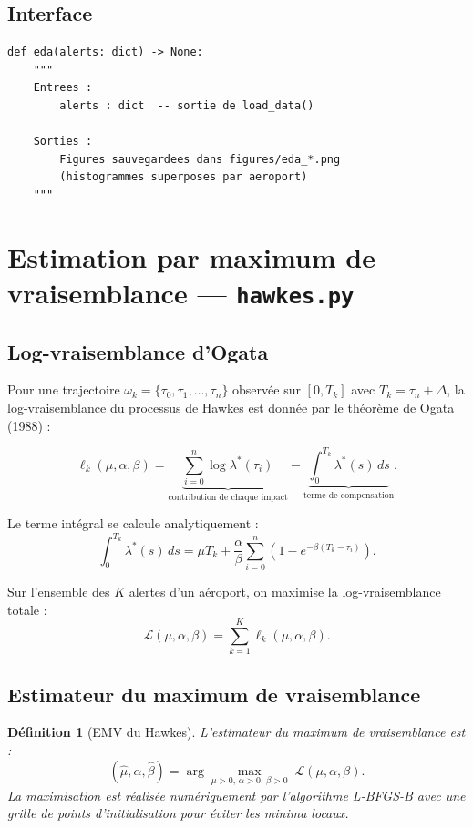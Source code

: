 \documentclass[a4paper,11pt]{article}
\newtheorem{definition}{Définition}[section]
\begin{document}
\subsection{Interface}

\begin{lstlisting}
def eda(alerts: dict) -> None:
    """
    Entrees :
        alerts : dict  -- sortie de load_data()

    Sorties :
        Figures sauvegardees dans figures/eda_*.png
        (histogrammes superposes par aeroport)
    """
\end{lstlisting}

\section{Estimation par maximum de vraisemblance --- \texttt{hawkes.py}}

\subsection{Log-vraisemblance d'Ogata}

Pour une trajectoire $\omega_k = \{\tau_0, \tau_1, \ldots, \tau_n\}$ observée sur $[0, T_k]$ avec $T_k = \tau_n + \Delta$, la log-vraisemblance du processus de Hawkes est donnée par le théorème de Ogata (1988) :

\[
\ell_k(\mu, \alpha, \beta) = \underbrace{\sum_{i=0}^{n} \log \lambda^*(\tau_i)}_{\text{contribution de chaque impact}} - \underbrace{\int_0^{T_k} \lambda^*(s)\,ds}_{\text{terme de compensation}}.
\]

Le terme intégral se calcule analytiquement :
\[
\int_0^{T_k} \lambda^*(s)\,ds = \mu T_k + \frac{\alpha}{\beta} \sum_{i=0}^{n} \left(1 - e^{-\beta(T_k - \tau_i)}\right).
\]

Sur l'ensemble des $K$ alertes d'un aéroport, on maximise la log-vraisemblance totale :
\[
\mathcal{L}(\mu, \alpha, \beta) = \sum_{k=1}^{K} \ell_k(\mu, \alpha, \beta).
\]

\subsection{Estimateur du maximum de vraisemblance}

\begin{definition}[EMV du Hawkes]
L'estimateur du maximum de vraisemblance est :
\[
(\hat\mu, \hat\alpha, \hat\beta) = \arg\max_{\mu > 0,\, \alpha > 0,\, \beta > 0} \;\mathcal{L}(\mu, \alpha, \beta).
\]
La maximisation est réalisée numériquement par l'algorithme L-BFGS-B avec une grille de points d'initialisation pour éviter les minima locaux.
\end{definition}
\end{document}
